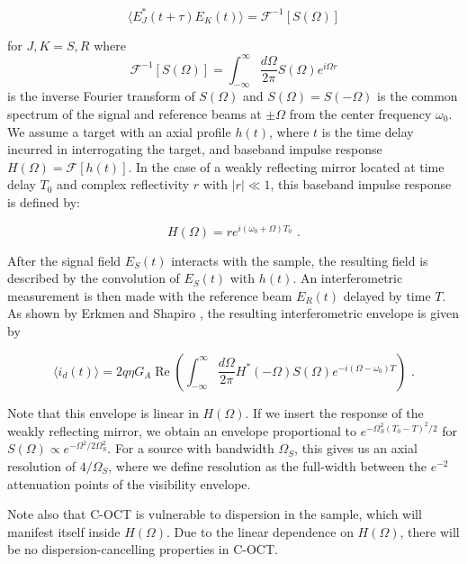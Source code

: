 \begin{equation}
\langle E_J^*(t+\tau) E_K(t) \rangle = \mathcal{F}^{-1}[S(\Omega)]
\end{equation}

for $J, K = S, R$ where
\begin{equation}
\mathcal{F}^{-1}[S(\Omega)] = \int_{-\infty}^{\infty} \frac{d\Omega}{2\pi} S(\Omega) e^{i \Omega r}
\end{equation}
is the inverse Fourier transform of $S(\Omega)$ and $S(\Omega) = S(-\Omega)$ is the common spectrum of the signal and reference beams at $\pm\Omega$ from the center frequency $\omega_0$. We assume a target with an axial profile $h(t)$, where $t$ is the time delay incurred in interrogating the target, and baseband impulse response $H(\Omega) = \mathcal{F}[h(t)]$. In the case of a weakly reflecting mirror located at time delay $T_0$ and complex reflectivity $r$ with $|r| \ll 1$, this baseband impulse response is defined by:

\begin{equation}
H(\Omega) = re^{i(\omega_0 + \Omega)T_0}\,\,.
\end{equation}

After the signal field $E_S(t)$ interacts with the sample, the resulting field is described by the convolution of $E_S(t)$ with $h(t)$. An interferometric measurement is then made with the reference beam $E_R(t)$ delayed by time $T$. As shown by Erkmen and Shapiro \cite{erkmen-pcoct}, the resulting interferometric envelope is given by

\begin{equation}
\langle i_d(t) \rangle = 2q\eta G_A \operatorname{Re}\left( \int_{-\infty}^{\infty} \frac{d\Omega}{2\pi} H^*(-\Omega) S(\Omega) e^{-i(\Omega-\omega_0)T}   \right)\,\,.
\end{equation}

Note that this envelope is linear in $H(\Omega)$. If we insert the response of the weakly reflecting mirror, we obtain an envelope proportional to $e^{-\Omega_S^2 (T_0 - T)^2 / 2}$ for $S(\Omega) \propto e^{-\Omega^2/2\Omega_S^2}$. For a source with bandwidth $\Omega_S$, this gives us an axial resolution of $4/\Omega_S$, where we define resolution as the full-width between the $e^{-2}$ attenuation points of the visibility envelope.

Note also that C-OCT is vulnerable to dispersion in the sample, which will manifest itself inside $H(\Omega)$. Due to the linear dependence on $H(\Omega)$, there will be no dispersion-cancelling properties in C-OCT.

